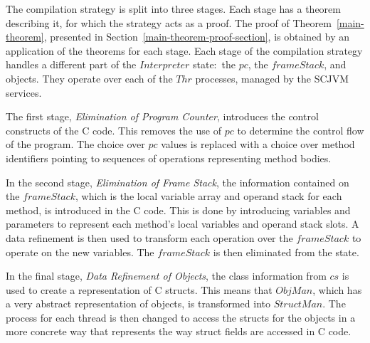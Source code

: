 The compilation strategy is split into three stages.
Each stage has a theorem describing it, for which the strategy acts as
a proof.
The proof of Theorem~\ref{main-theorem}, presented in
Section~\ref{main-theorem-proof-section}, is obtained by an
application of the theorems for each stage.
Each stage of the compilation strategy handles a different part of the
$Interpreter$ state:~the $pc$, the $frameStack$, and objects.
They operate over each of the $Thr$ processes, managed by the SCJVM
services.

The first stage, \emph{Elimination of Program Counter}, introduces the
control constructs of the C code.
This removes the use of $pc$ to determine the control flow of the
program.
The choice over $pc$ values is replaced with a choice over method
identifiers pointing to sequences of operations representing method
bodies.

In the second stage, \emph{Elimination of Frame Stack}, the
information contained on the $frameStack$, which is the local variable
array and operand stack for each method, is introduced in the C code.
This is done by introducing variables and parameters to represent each
method's local variables and operand stack slots.
A data refinement is then used to transform each operation over the
$frameStack$ to operate on the new variables.
The $frameStack$ is then eliminated from the state.

In the final stage, \emph{Data Refinement of Objects}, the class
information from $cs$ is used to create a representation of C structs.
This means that $ObjMan$, which has a very abstract representation of
objects, is transformed into $StructMan$.
The process for each thread is then changed to access the structs for
the objects in a more concrete way that represents the way struct
fields are accessed in C code.


